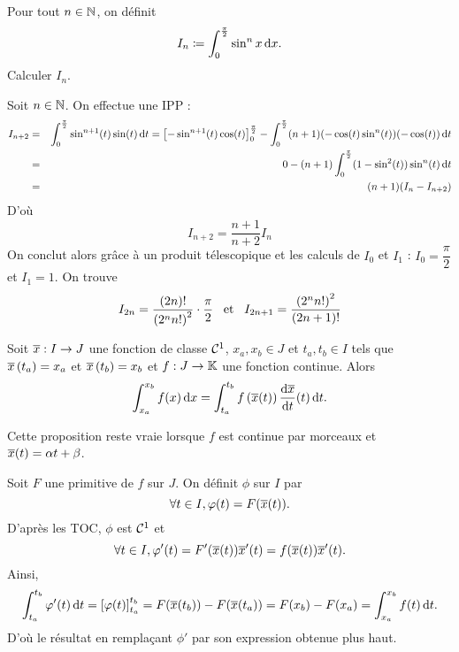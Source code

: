 \documentclass{magnolia}
\begin{document}
\begin{exoUnique}
\exo[utile=3] Pour tout $n\in\mathbb{N}$, on définit
  \[I_n\coloneqq\int_{0}^{\frac{\pi}{2}} \sin^n x\,\text{d}x.\]
  Calculer $I_n$.
  \begin{sol}
  Soit $n\in\mathbb{N}$. On effectue une IPP :
\begin{eqnarray*}
I_{n+2}&=&\int_{0}^{\frac{\pi}{2}} \sin^{n+1} (t)\sin (t)\,\text{d}t=\left[-\sin^{n+1} (t) \cos (t)\right]_0^{\frac{\pi}{2}}-\int_{0}^{\frac{\pi}{2}} (n+1)(-\cos (t) \sin^n (t))(-\cos(t))\,\text{d}t\\
&=&0-(n+1)\int_{0}^{\frac{\pi}{2}} (1-\sin^2(t))\sin^n(t)\,\text{d}t\\
&=&(n+1)(I_n-I_{n+2})
\end{eqnarray*}
D'où $$I_{n+2}=\frac{n+1}{n+2}I_n$$ On conclut alors grâce à un produit télescopique et les calculs de $I_0$ et $I_1$ : $I_0=\dfrac{\pi}{2}$ et $I_1=1$.
  On trouve
  \[I_{2n}=\frac{\left(2n\right)!}{\left(2^n n!\right)^2}\cdot\frac{\pi}{2} \quad\!\text{et}\quad\!
    I_{2n+1}=\frac{\left(2^n n!\right)^2}{\left(2n+1\right)!}\]
  \end{sol}
\end{exoUnique}

\begin{proposition}[nom={Changement de variable}]
Soit $\overline{x}:I\to J$ une fonction de classe
$\mathcal{C}^{1}$, $x_a,x_b\in J$ et $t_a,t_b\in I$ tels que
$\overline{x}\left(t_a\right)=x_a$ et $\overline{x}\left(t_b\right)=x_b$ et $f:J\to\mathbb{K}$ une fonction continue. Alors
\[\int_{x_a}^{x_b} f(x)\,\text{d}x=\int_{t_a}^{t_b} f\left(\overline{x}(t)\right)
  \frac{\text{d}\overline{x}}{\text{d}t}(t)\,\text{d}t.\]
\end{proposition}

\begin{remarqueUnique}
\remarque Cette proposition reste vraie lorsque $f$ est continue par
  morceaux et $\overline{x}(t)=\alpha t+\beta$.
\end{remarqueUnique}

\begin{preuve}
Soit $F$ une primitive de $f$ sur $J$. On définit $\phi$ sur $I$ par $$\forall t \in I, \varphi(t)=F(\overline{x}(t)).$$
D'après les TOC, $\phi$ est $\mathcal{C}^{1}$ et $$\forall t \in I, \varphi'(t)=F'(\overline{x}(t))\overline{x}'(t)=f(\overline{x}(t))\overline{x}'(t).$$
Ainsi, $$\int_{t_a}^{t_b} \varphi'(t)\,\text{d}t=\left[ \varphi(t) \right]_{t_a}^{t_b}=F(\overline{x}(t_b))-F(\overline{x}(t_a))=F(x_b)-F(x_a)=\int_{x_a}^{x_b} f(t)\,\text{d}t.$$
D'où le résultat en remplaçant $\phi'$ par son expression obtenue plus haut.
\end{preuve}
\end{document}
